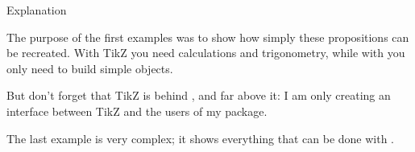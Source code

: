 %

Explanation

The purpose of the first examples was to show how simply these propositions can be recreated. With TikZ you need calculations and trigonometry, while with  you only need to build simple objects.

But don't forget that TikZ is behind , and far above it: I am only creating an interface between TikZ and the users of my package.

The last example is very complex; it shows everything that can be done with .


